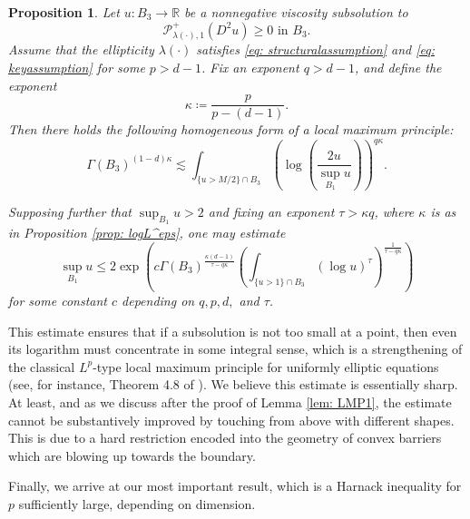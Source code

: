 \documentclass[reqno]{amsart}
\numberwithin{equation}{section}
\newtheorem{prop}[thm]{Proposition}
\numberwithin{equation}{section}
\newcommand{\R}{\mathbb R}
\begin{document}
\begin{prop}
\label{prop: LMP2}
Let $u:B_3 \to \R$ be a nonnegative viscosity subsolution to 
$$\mathcal{P}^+_{\lambda(\cdot),1}(D^2u)  \ge 0  \text{ in } B_3.$$
Assume that the ellipticity $\lambda(\cdot)$ satisfies \eqref{eq: structuralassumption} and \eqref{eq: keyassumption} for some $p>d-1$. Fix an exponent $q>d-1$, and define the exponent
$$\kappa \coloneqq \frac{p}{p-(d-1)}.$$
Then there holds the following homogeneous form of a local maximum principle:
$$\Gamma(B_3)^{(1-d)\kappa} \lesssim  \int_{\{u>M/2\} \cap B_3} \left(\log \left(\frac{2u}{\sup_{B_1}u}\right)\right)^{q\kappa}.$$

Supposing further that $\sup_{B_1} u>2$ and fixing an exponent $\tau>\kappa q$, where $\kappa$ is as in Proposition \ref{prop: logL^eps}, one may estimate
$$\sup_{B_1} u \le 2 \exp\left(c\Gamma(B_3)^{\frac{\kappa(d-1)}{\tau - q\kappa}} \left(\int_{\{u>1\} \cap B_3} (\log u)^{\tau}\right)^{\frac{1}{\tau - q\kappa}}\right)$$
for some constant $c$ depending on $q,p,d,$ and $\tau$. 
\end{prop}
This estimate ensures that if a subsolution is not too small at a point, then even its logarithm must concentrate in some integral sense, which is a strengthening of the classical $L^p$-type local maximum principle for uniformly elliptic equations (see, for instance, Theorem 4.8 of \cite{CaffarelliCabre1995}). We believe this estimate is essentially sharp. At least, and as we discuss after the proof of Lemma \ref{lem: LMP1}, the estimate cannot be substantively improved by touching from above with different shapes. This is due to a hard restriction encoded into the geometry of convex barriers which are blowing up towards the boundary. 


Finally, we arrive at our most important result, which is a Harnack inequality for $p$ sufficiently large, depending on dimension. 
\end{document}
